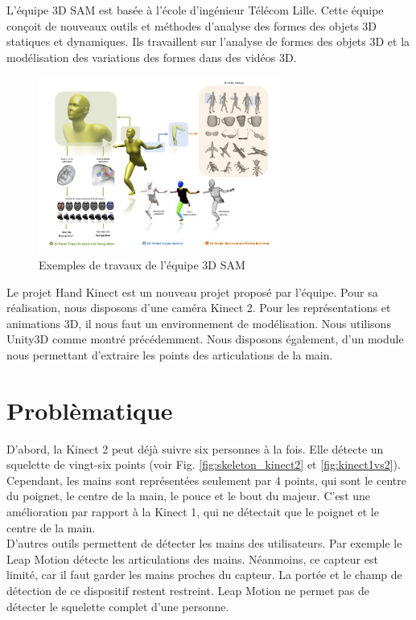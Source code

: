 L'équipe 3D SAM est basée à l'école d'ingénieur Télécom Lille. 
Cette équipe conçoit de nouveaux outils et méthodes d'analyse des 
formes des objets 3D statiques et dynamiques. Ils travaillent sur 
l'analyse de formes des objets 3D et la modélisation des variations 
des formes dans des vidéos 3D.

\begin{figure}[H]
  \begin{center}
    \includegraphics[width=300px]{images/accueil-illus.jpg}
    \caption{Exemples de travaux de l'équipe 3D SAM}
  \end{center}
\end{figure}

Le projet \og Hand Kinect \fg est un nouveau projet proposé par 
l'équipe.
Pour sa réalisation, nous disposons d'une caméra Kinect 2. 
Pour les représentations et animations 3D, il nous faut un environnement 
de modélisation. Nous utilisons Unity3D comme montré précédemment. 
Nous disposons également, d'un module nous permettant d'extraire les 
points des articulations de la main.

\section{Problèmatique}
D'abord, la Kinect 2 peut déjà suivre six personnes à la fois. Elle 
détecte un squelette de vingt-six points (voir Fig. 
\ref{fig:skeleton_kinect2} et \ref{fig:kinect1vs2}). Cependant, les 
mains sont représentées seulement par 4 points, qui sont le centre du
poignet, le centre de la main, le pouce et le bout du majeur. C'est une 
amélioration par rapport à la Kinect 1, qui ne détectait que le poignet 
et le centre de la main.\\

D'autres outils permettent de détecter les mains des utilisateurs. Par 
exemple le Leap Motion détecte les articulations des mains. Néanmoins,
ce capteur est limité, car il faut garder les mains proches du capteur.
La portée et le champ de détection de ce dispositif restent restreint. 
Leap Motion ne permet pas de détecter le squelette complet d'une personne.\\

